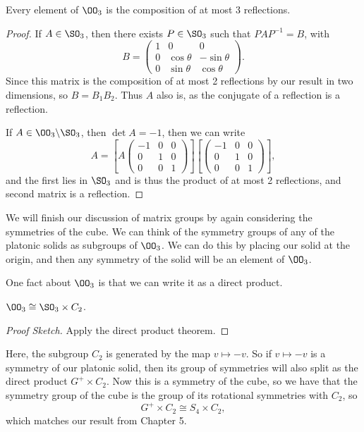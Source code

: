 \begin{corollary}
	Every element of $\OO_3$ is the composition of at most 3 reflections.
\end{corollary}
\begin{proof}
	If $A \in \SO_3$, then there exists $P \in \SO_3$ such that $PAP^{-1} = B$, with
	$$
	B = \begin{pmatrix}
		1 & 0 & 0 \\
		0 & \cos \theta & - \sin \theta \\
		0 & \sin \theta & \cos \theta
	\end{pmatrix}.
	$$
	Since this matrix is the composition of at most 2 reflections by our result in two dimensions, so $B = B_1 B_2$. Thus $A$ also is, as the conjugate of a reflection is a reflection.

	If $A \in \OO_3 \backslash \SO_3$, then $\det A = -1$, then we can write
	$$
	A = \left[A \begin{pmatrix}
		-1 & 0 & 0 \\
		0 & 1 & 0 \\
		0 & 0 & 1
	\end{pmatrix}\right] \left[\begin{pmatrix}
		-1 & 0 & 0 \\
		0 & 1 & 0 \\
		0 & 0 & 1
	\end{pmatrix}\right],
	$$
	and the first lies in $\SO_3$ and is thus the product of at most 2 reflections, and second matrix is a reflection.
\end{proof}




We will finish our discussion of matrix groups by again considering the symmetries of the cube.
We can think of the symmetry groups of any of the platonic solids as subgroups of $\OO_3$. We can do this by placing our solid at the origin, and then any symmetry of the solid will be an element of $\OO_3$.

One fact about $\OO_3$ is that we can write it as a direct product.

\begin{lemma}
	$\OO_3 \cong \SO_3 \times C_2$.
\end{lemma}
\begin{proof}[Proof Sketch] Apply the direct product theorem.
\end{proof}

Here, the subgroup $C_2$ is generated by the map $v \mapsto -v$. So if $v \mapsto -v$ is a symmetry of our platonic solid, then its group of symmetries will also split as the direct product $G^+ \times C_2$. Now this is a symmetry of the cube, so we have that the symmetry group of the cube is the group of its rotational symmetries with $C_2$, so
$$
G^+ \times C_2 \cong S_4 \times C_2,
$$
which matches our result from Chapter 5.





